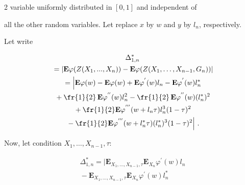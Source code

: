 \begin{multicols}{2}
    variable uniformly distributed in $[0,1]$ and independent of

    all the other random variables. Let replace $x$ by $w$ and $y$ by $l_n$, respectively.

Let write



\noindent

     \begin{multline*}

    \Delta^{*}_{1,n}\\

    {}=\left\vert\mathbf{E}\varphi(Z(X_1,...,X_n))-

    \mathbf{E}\varphi(Z(X_1,\ldots,X_{n-1},G_n))\right\vert\\

    {}=

    \left\vert\vphantom{\fr{1}{2}}

    \mathbf{E}\varphi(w)-\mathbf{E}\varphi(w)+\mathbf{E}\varphi^{'}(w)l_n-

    \mathbf{E}\varphi^{'}(w)l_n^{*}\right.\\

    {}+

    \fr{1}{2}\,\mathbf{E}\varphi^{''}(w)l_n^2-

    \fr{1}{2}\,\mathbf{E}\varphi^{''}(w)(l_n^{*})^2\\

{}+

    \fr{1}{2}\mathbf{E}\varphi^{'''}(w+l_n\tau )l_n^3(1-\tau)^{2}\\

\left.    {}-

    \fr{1}{2}\mathbf{E}\varphi^{'''}(w+l_n^{*}\tau)(l_n^{*})^3(1-\tau)^{2}\right\vert\,.

    \end{multline*}

    Now, let condition $X_1,\ldots,X_{n-1},\tau$:

    

    \noindent

    \begin{multline*}

    \Delta^{*}_{1,n}=

    \Big|\mathbf{E}_{X_1,\ldots,X_{n-1},\tau} \mathbf{E}_{X_{n}}\varphi^{'}(w)l_n\\

    {}-

    \mathbf{E}_{X_1,\ldots,X_{n-1},\tau}

    \mathbf{E}_{X_{n}}\varphi^{'}(w)l_n^{*}\\


\end{multline*}
\end{multicols}
